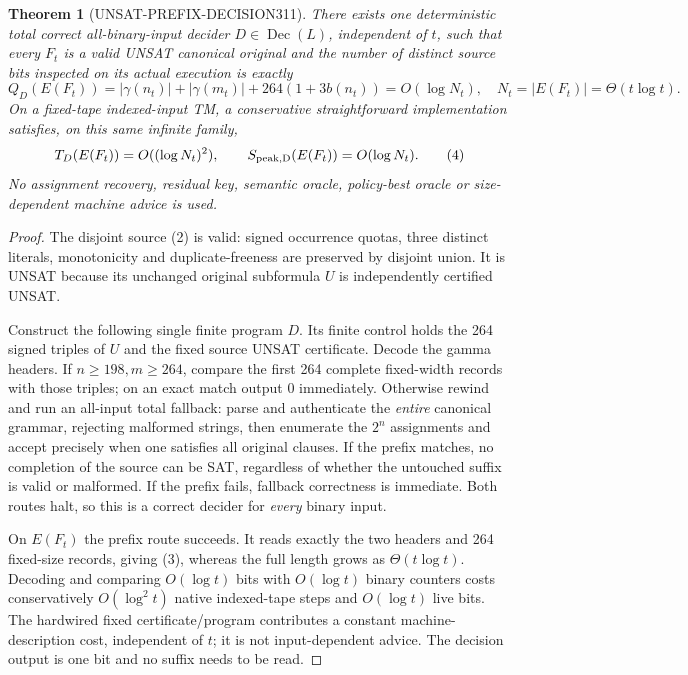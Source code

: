 \documentclass[11pt]{article}
\newtheorem{theorem}{Theorem}
\begin{document}
\begin{theorem}[UNSAT-PREFIX-DECISION311]
There exists one deterministic total correct all-binary-input decider
$D\in\operatorname{Dec}(L)$, independent of $t$, such that \emph{every}
$F_t$ is a valid UNSAT canonical original and the number of distinct
source bits inspected on its actual execution is exactly
\[
Q_D(E(F_t))=
|\gamma(n_t)|+|\gamma(m_t)|+264(1+3b(n_t))=O(\log N_t),
\quad N_t=|E(F_t)|=\Theta(t\log t).
\tag{3}
\]
On a fixed-tape indexed-input TM, a conservative straightforward
implementation satisfies, on this same infinite family,
\[
T_D(E(F_t))=O((\log N_t)^2),\qquad
S_{\rm peak,D}(E(F_t))=O(\log N_t).
\tag{4}
\]
No assignment recovery, residual key, semantic oracle, policy-best
oracle or size-dependent machine advice is used.
\end{theorem}
\begin{proof}
The disjoint source (2) is valid: signed occurrence quotas, three
distinct literals, monotonicity and duplicate-freeness are preserved by
disjoint union. It is UNSAT because its unchanged original subformula
$U$ is independently certified UNSAT.

Construct the following single finite program $D$. Its finite control
holds the 264 signed triples of $U$ and the fixed source UNSAT
certificate. Decode the gamma headers. If $n\ge198,m\ge264$, compare
the first 264 complete fixed-width records with those triples; on
an exact match output $0$ immediately. Otherwise rewind and run an
all-input total fallback: parse and authenticate the \emph{entire}
canonical grammar, rejecting malformed strings, then enumerate the
$2^n$ assignments and accept precisely when one satisfies all original
clauses. If the prefix matches, no completion of the source can be
SAT, regardless of whether the untouched suffix is valid or malformed.
If the prefix fails, fallback correctness is immediate. Both routes
halt, so this is a correct decider for \emph{every} binary input.

On $E(F_t)$ the prefix route succeeds. It reads exactly the two headers
and 264 fixed-size records, giving (3), whereas the full length grows
as $\Theta(t\log t)$. Decoding and comparing $O(\log t)$ bits with
$O(\log t)$ binary counters costs conservatively $O(\log^2t)$
native indexed-tape steps and $O(\log t)$ live bits. The hardwired fixed
certificate/program contributes a constant machine-description cost,
independent of $t$; it is not input-dependent advice. The decision output
is one bit and no suffix needs to be read.
\end{proof}
\end{document}
